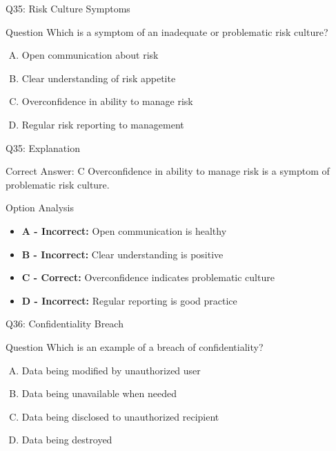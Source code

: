 \documentclass{beamer}
\begin{document}
	\begin{frame}{Q35: Risk Culture Symptoms}
		\begin{block}{Question}
			Which is a symptom of an inadequate or problematic risk culture?
		\end{block}
		\begin{enumerate}[(A)]
			\item Open communication about risk
			\item Clear understanding of risk appetite
			\item Overconfidence in ability to manage risk
			\item Regular risk reporting to management
		\end{enumerate}
	\end{frame}
	
	\begin{frame}{Q35: Explanation}
		\begin{block}{Correct Answer: C}
			Overconfidence in ability to manage risk is a symptom of problematic risk culture.
		\end{block}
		\begin{block}{Option Analysis}
			\begin{itemize}
				\item \textbf{A - Incorrect:} Open communication is healthy
				\item \textbf{B - Incorrect:} Clear understanding is positive
				\item \textbf{C - Correct:} Overconfidence indicates problematic culture
				\item \textbf{D - Incorrect:} Regular reporting is good practice
			\end{itemize}
		\end{block}
	\end{frame}
	
	\begin{frame}{Q36: Confidentiality Breach}
		\begin{block}{Question}
			Which is an example of a breach of confidentiality?
		\end{block}
		\begin{enumerate}[(A)]
			\item Data being modified by unauthorized user
			\item Data being unavailable when needed
			\item Data being disclosed to unauthorized recipient
			\item Data being destroyed
		\end{enumerate}
	\end{frame}
	
\end{document}
